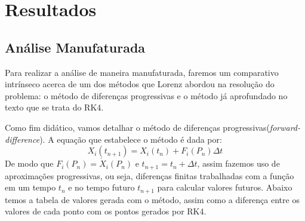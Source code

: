 \documentclass[12pt, a4paper]{article}
\begin{document}
    \newpage
    
    
    \section{Resultados}
    \subsection{Análise Manufaturada}
    
    Para realizar a análise de maneira manufaturada, faremos um comparativo intrínseco acerca de um dos métodos que Lorenz abordou na resolução do problema: o método de diferenças progressivas\cite{Lorenz1963} e o método já aprofundado no texto que se trata do RK4.
    
    Como fim didático, vamos detalhar o método de diferenças progressivas(\textit{forward-difference}). A equação que estabelece o método é dada por: 
    \begin{equation*}
        X_i(t_{n+1})=X_i(t_n)+F_i(P_n)\Delta t
    \end{equation*}
    De modo que $F_i(P_n) = \dot X_i(P_n)$ e $t_{n+1} = t_n + \Delta t$, assim fazemos uso de aproximações progressivas, ou seja, diferenças finitas trabalhadas com a função em um tempo $t_n$ e no tempo futuro $t_{n+1}$ para calcular valores futuros.  Abaixo temos a tabela de valores gerada com o método, assim como a diferença entre os valores de cada ponto com os pontos gerados por RK4.
    
\end{document}
